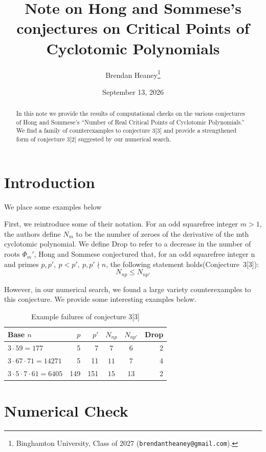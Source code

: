 \documentclass[11pt,letterpaper]{article}
\title{Note on Hong and Sommese's conjectures on Critical Points
  of Cyclotomic Polynomials}
\author{Brendan Heaney\thanks{Binghamton University, Class of 2027
  (\texttt{brendantheaney@gmail.com}).}}
\date{September 13, 2026}
\theoremstyle{plain}
\theoremstyle{definition}
\theoremstyle{remark}
\begin{document}
\maketitle
\begin{abstract}
In this note we provide the results of computational checks on the various
conjectures of Hong and Sommese's ``Number of Real Critical Points of
Cyclotomic Polynomials.'' We find a family of counterexamples to conjecture
3[3] and provide a strengthened form of conjecture 3[2] suggested by our numerical search.
\end{abstract}

\section{Introduction}

We place some examples below

First, we reintroduce some of their notation. For an odd squarefree integer
\(m>1\), the authors define \(N_m\) to be the number of zeroes of the
derivative of the mth cyclotomic polynomial. We define Drop to refer to a
decrease in the number of roots \(\Phi_m'\), Hong and Sommese conjectured
that, for an odd squarefree integer n and primes \(p,p',\ p<p',\ p,p'\nmid n\), the following statement
holds(Conjecture~3[3]):
\[
N_{np}\le N_{np'}
\]

However, in our numerical search, we found a large variety counterexamples to this conjecture. We provide some interesting examples below.

\begin{table}[htbp]
\centering
\small
\begin{tabular}{@{}lrrccr@{}}
\toprule
Base \(n\) & \(p\) & \(p'\) & \(N_{np}\) & \(N_{np'}\) & Drop \\
\midrule
\(3\cdot59=177\) & 5 & 7 & \(7\) & \(6\) & 2 \\
\(3\cdot67\cdot71=14271\) & 5 & 11 & \(11\) & \(7\) & 4 \\
\(3\cdot5\cdot7\cdot61=6405\) & 149 & 151 & \(15\) & \(13\) & 2 \\
\bottomrule
\end{tabular}
\caption{Example failures of conjecture 3[3]}
\end{table}


\clearpage
\section{Numerical Check}
\end{document}
